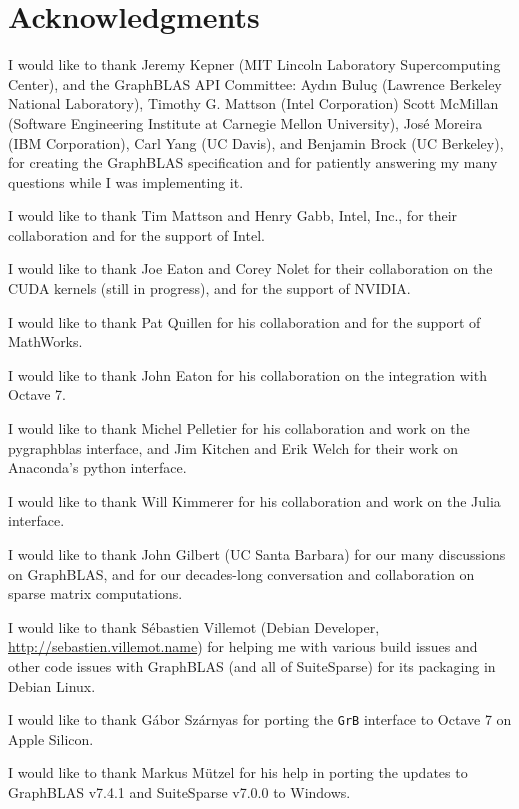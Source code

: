 
\section{Acknowledgments}

I would like to thank Jeremy Kepner (MIT Lincoln Laboratory Supercomputing
Center), and the GraphBLAS API Committee: Ayd\i n Bulu\c{c} (Lawrence Berkeley
National Laboratory), Timothy G. Mattson (Intel Corporation) Scott McMillan
(Software Engineering Institute at Carnegie Mellon University), Jos\'e Moreira
(IBM Corporation), Carl Yang (UC Davis), and Benjamin Brock (UC Berkeley), for
creating the GraphBLAS specification and for patiently answering my many
questions while I was implementing it.

I would like to thank Tim Mattson and Henry Gabb, Intel, Inc., for their
collaboration and for the support of Intel.

I would like to thank Joe Eaton and Corey Nolet for their collaboration on the
CUDA kernels (still in progress), and for the support of NVIDIA.

I would like to thank Pat Quillen for his
collaboration and for the support of MathWorks.

I would like to thank John Eaton for his collaboration on the integration
with Octave 7.

I would like to thank Michel Pelletier for his collaboration and work on the
pygraphblas interface, and Jim Kitchen and Erik Welch for their work on
Anaconda's python interface.

I would like to thank Will Kimmerer for his collaboration and work on the
Julia interface.

I would like to thank John Gilbert (UC Santa Barbara) for our many discussions
on GraphBLAS, and for our decades-long conversation and collaboration on sparse
matrix computations.

I would like to thank S\'ebastien Villemot (Debian Developer,
\url{http://sebastien.villemot.name}) for helping me with various build issues
and other code issues with GraphBLAS (and all of SuiteSparse) for its packaging
in Debian Linux.

I would like to thank G{\'{a}}bor Sz{\'{a}}rnyas for porting the \verb'GrB'
interface to Octave 7 on Apple Silicon.

I would like to thank Markus M\"{u}tzel
for his help in porting the updates
to GraphBLAS v7.4.1 and SuiteSparse v7.0.0 to Windows.


